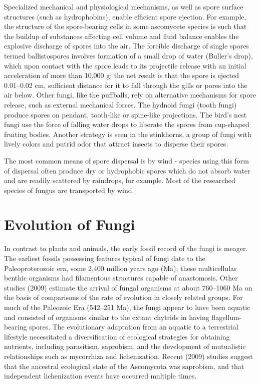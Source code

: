 Specialized mechanical and physiological mechanisms, as well as spore surface structures (such as hydrophobins), enable efficient spore ejection. For example, the structure of the spore-bearing cells in some ascomycete species is such that the buildup of substances affecting cell volume and fluid balance enables the explosive discharge of spores into the air. The forcible discharge of single spores termed ballistospores involves formation of a small drop of water (Buller's drop), which upon contact with the spore leads to its projectile release with an initial acceleration of more than 10,000 g; the net result is that the spore is ejected 0.01--0.02 cm, sufficient distance for it to fall through the gills or pores into the air below. Other fungi, like the puffballs, rely on alternative mechanisms for spore release, such as external mechanical forces. The hydnoid fungi (tooth fungi) produce spores on pendant, tooth-like or spine-like projections. The bird's nest fungi use the force of falling water drops to liberate the spores from cup-shaped fruiting bodies. Another strategy is seen in the stinkhorns, a group of fungi with lively colors and putrid odor that attract insects to disperse their spores.

The most common means of spore dispersal is by wind - species using this form of dispersal often produce dry or hydrophobic spores which do not absorb water and are readily scattered by raindrops, for example. Most of the researched species of fungus are transported by wind.

\hypertarget{evolution-of-fungi}{%
\section{Evolution of Fungi}\label{evolution-of-fungi}}

In contrast to plants and animals, the early fossil record of the fungi is meager. The earliest fossils possessing features typical of fungi date to the Paleoproterozoic era, some 2,400 million years ago (Ma); these multicellular benthic organisms had filamentous structures capable of anastomosis. Other studies (2009) estimate the arrival of fungal organisms at about 760--1060 Ma on the basis of comparisons of the rate of evolution in closely related groups. For much of the Paleozoic Era (542--251 Ma), the fungi appear to have been aquatic and consisted of organisms similar to the extant chytrids in having flagellum-bearing spores. The evolutionary adaptation from an aquatic to a terrestrial lifestyle necessitated a diversification of ecological strategies for obtaining nutrients, including parasitism, saprobism, and the development of mutualistic relationships such as mycorrhiza and lichenization. Recent (2009) studies suggest that the ancestral ecological state of the Ascomycota was saprobism, and that independent lichenization events have occurred multiple times.

